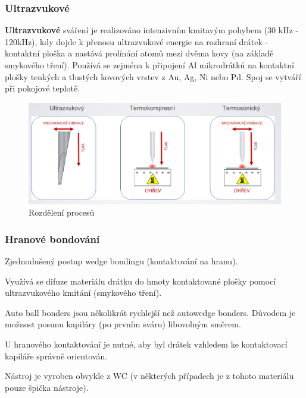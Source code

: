 \subsubsection{Ultrazvukové}
\textbf{Ultrazvukové} sváření je realizováno intenzivním kmitavým pohybem (30
kHz - 120kHz), kdy dojde k přenosu ultrazvukové energie na rozhraní drátek - kontaktní ploška a nastává prolínání atomů mezi dvěma kovy (na základě smykového tření). Používá se zejména k připojení Al mikrodrátků na kontaktní plošky tenkých a tlustých kovových vrstev z Au, Ag, Ni nebo Pd. Spoj se vytváří při pokojové teplotě.
\begin{figure}[h]
   \begin{center}
     \includegraphics[scale=0.6]{images/Bond.png}
   \end{center}
   \caption{Rozdělení procesů}
\end{figure}

\subsubsection{Hranové bondování}
Zjednodušený postup wedge bondingu (kontaktování na hranu).

Využívá se difuze materiálu drátku do hmoty kontaktované plošky pomocí ultrazvukového kmitání (smykového tření).

Auto ball bonders jsou několikrát rychlejší než autowedge bonders. Důvodem je možnost posunu kapiláry (po prvním sváru) libovolným směrem.

U hranového kontaktování je nutné, aby byl drátek vzhledem ke kontaktovací kapiláře správně orientován.

Nástroj je vyroben obvykle z WC (v některých případech je z tohoto
materiálu pouze špička nástroje).

